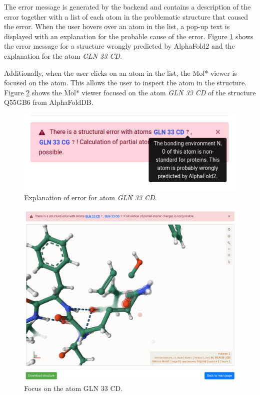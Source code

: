 \documentclass[
  digital,     %
  oneside,     %
  nosansbold,  %
  nocolorbold, %
  lof,         %
  lot,         %
]{fithesis4}
\begin{document}
The error message is generated by the backend and contains a description of the error together with a list of each atom in the problematic structure that caused the error. When the user hovers over an atom in the list, a pop-up text is displayed with an explanation for the probable cause of the error. Figure \ref{fig:wrong_structure_text} shows the error message for a structure wrongly predicted by AlphaFold2 and the explanation for the atom \textit{GLN 33 CD}.

Additionally, when the user clicks on an atom in the list, the Mol* viewer is focused on the atom. This allows the user to inspect the atom in the structure. Figure \ref{fig:wrong_structure_focus} shows the Mol* viewer focused on the atom \textit{GLN 33 CD} of the structure Q55GB6 from AlphaFoldDB.

\begin{figure}[htbp]
  \begin{center}
    \includegraphics[width=\textwidth,frame]{figures/wrong_structure_text.png}
  \end{center}
  \caption{Explanation of error for atom \textit{GLN 33 CD}.}
  \label{fig:wrong_structure_text}
\end{figure}

\begin{figure}[htbp]
  \begin{center}
    \includegraphics[width=\textwidth,frame]{figures/wrong_structure_focus.png}
  \end{center}
  \caption{Focus on the atom GLN 33 CD.}
  \label{fig:wrong_structure_focus}
\end{figure}
\end{document}
